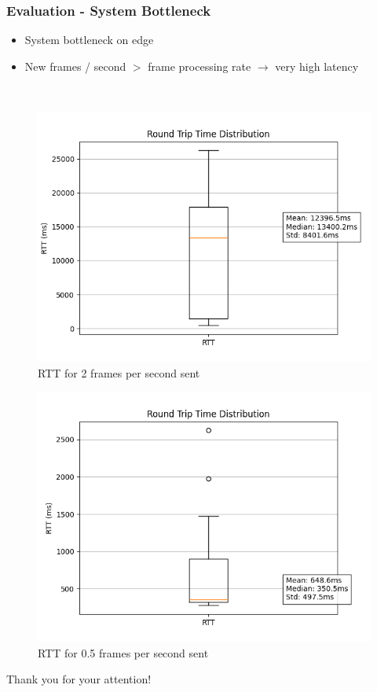\documentclass{beamer}
\begin{document}
\begin{frame}
    \frametitle{Evaluation - System Bottleneck}
    \begin{itemize}
        \item System bottleneck on edge
        \item New frames / second $>$ frame processing rate $\rightarrow$ very high latency
    \end{itemize}\
    
\begin{figure}
    \centering
    \begin{minipage}{0.48\textwidth}
        \centering
        \includegraphics[width=\linewidth]{./res/rtt_distribution-local_docker_test20skip.png}
        RTT for 2 frames per second sent
    \end{minipage}
    \hfill
    \begin{minipage}{0.48\textwidth}
        \centering
        \includegraphics[width=\linewidth]{./res/rtt_distribution-docker_test-60skip.png}
        RTT for 0.5 frames per second sent
    \end{minipage}
\end{figure}
\end{frame}

\begin{frame}
    Thank you for your attention!
\end{frame}
\end{document}
